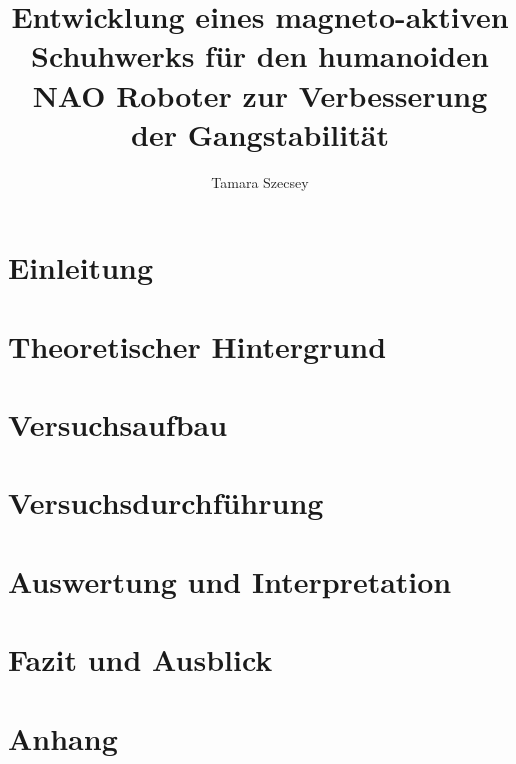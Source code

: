 \documentclass[a4paper,
DIV=13,
12pt,
BCOR=10mm,
department=FakEI,
oneside,
parskip=half,
automark,
]{OTHRartcl}
\title{Entwicklung eines magneto-aktiven Schuhwerks für den humanoiden NAO Roboter zur Verbesserung der Gangstabilität}
\author{Tamara Szecsey}
\begin{document}
\maketitle
\makedeclaration

\thispagestyle{empty}
\tableofcontents	
\clearpage	
\setcounter{page}{1}

\section{Einleitung}


\newpage
\section{Theoretischer Hintergrund} \label{theorie}

\newpage
\section{Versuchsaufbau}\label{aufbau}

%
\newpage
\section{Versuchsdurchführung}\label{durchführung}


\FloatBarrier
\newpage
\section{Auswertung und Interpretation}\label{auswertung}


%
\FloatBarrier
\newpage
\section{Fazit und Ausblick}

%
\FloatBarrier
\newpage
\section{Anhang} \label{Anhang}


\FloatBarrier
\newpage
\clearpage	
\printbibliography
\end{document}
